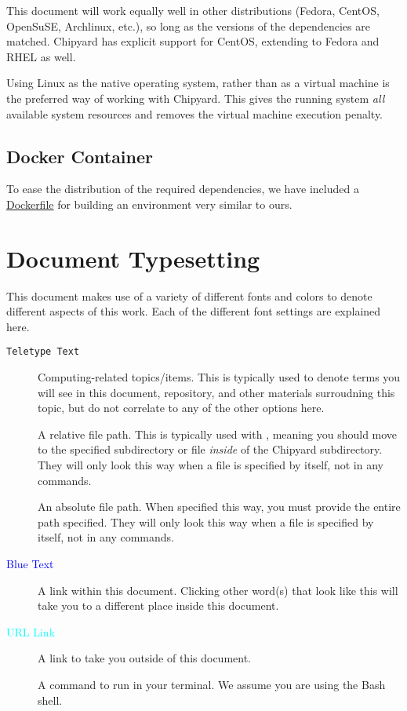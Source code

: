 This document will work equally well in other distributions (Fedora, CentOS, OpenSuSE, Archlinux, etc.), so long as the versions of the dependencies are matched.
Chipyard has explicit support for CentOS, extending to Fedora and RHEL as well.

Using Linux as the native operating system, rather than as a virtual machine is the preferred way of working with Chipyard.
This gives the running system \emph{all} available system resources and removes the virtual machine execution penalty.

\subsection{Docker Container}\label{sec:Docker_Container}
To ease the distribution of the required dependencies, we have included a \href{https://github.com/KarlJoad/ece497/blob/master/docker/Dockerfile}{Dockerfile} for building an environment very similar to ours.

\section{Document Typesetting}\label{sec:Doc_Typesetting}
This document makes use of a variety of different fonts and colors to denote different aspects of this work.
Each of the different font settings are explained here.

\begin{description}
\item[\texttt{Teletype Text}] Computing-related topics/items.
  This is typically used to denote terms you will see in this document, repository, and other materials surroudning this topic, but do not correlate to any of the other options here.
\item[] A relative file path.
  This is typically used with , meaning you should move to the specified subdirectory or file \emph{inside} of the Chipyard subdirectory.
  They will only look this way when a file is specified by itself, not in any commands.
\item[] An absolute file path.
  When specified this way, you must provide the entire path specified.
  They will only look this way when a file is specified by itself, not in any commands.
\item[\textnormal{\textcolor{blue}{Blue Text}}] A link within this document.
  Clicking other word(s) that look like this will take you to a different place inside this document.
\item[\textnormal{\textcolor{cyan}{URL Link}}] A link to take you outside of this document.
\item[] A command to run in your terminal.
  We assume you are using the Bash shell.
\end{description}

